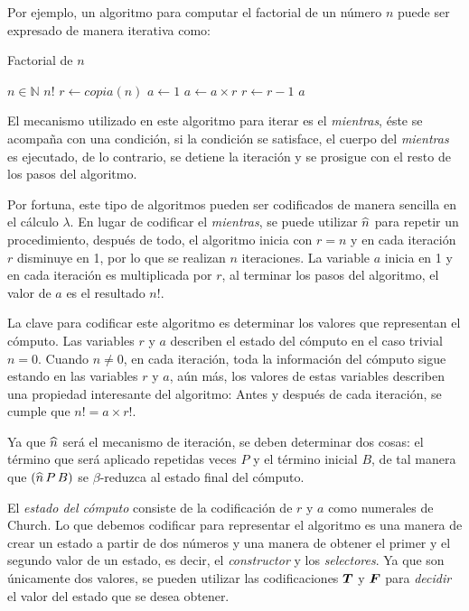 Por ejemplo, un algoritmo para computar el factorial de un número \( n \) puede ser expresado de manera iterativa como:

\begin{algorithm}
  \caption{Factorial de \( n \)}
  \label{alg:factorial}
  \begin{algorithmic}
    \REQUIRE \( n \in \mathbb{N} \)
    \ENSURE \( n! \)
    \STATE \( r \leftarrow copia(n) \)
    \STATE \( a \leftarrow 1 \)
    \STATE \( a \leftarrow a \times r \)
    \STATE \( r \leftarrow r - 1 \)
    \ENDWHILE
    \RETURN \( a \)
  \end{algorithmic}
\end{algorithm}

El mecanismo utilizado en este algoritmo para iterar es el \emph{mientras}, éste se acompaña con una condición, si la condición se satisface, el cuerpo del \emph{mientras} es ejecutado, de lo contrario, se detiene la iteración y se prosigue con el resto de los pasos del algoritmo.

Por fortuna, este tipo de algoritmos pueden ser codificados de manera sencilla en el cálculo \( λ \). En lugar de codificar el \emph{mientras}, se puede utilizar \( \widehat{n} \) para repetir un procedimiento, después de todo, el algoritmo inicia con \( r = n \) y en cada iteración \( r \) disminuye en 1, por lo que se realizan \( n \) iteraciones. La variable \( a \) inicia en 1 y en cada iteración es multiplicada por \( r \), al terminar los pasos del algoritmo, el valor de \( a \) es el resultado \( n! \).

La clave para codificar este algoritmo es determinar los valores que representan el cómputo. Las variables \( r \) y \( a \) describen el estado del cómputo en el caso trivial \( n = 0 \). Cuando \( n \not= 0 \), en cada iteración, toda la información del cómputo sigue estando en las variables \( r \) y \( a \), aún más, los valores de estas variables describen una propiedad interesante del algoritmo: Antes y después de cada iteración, se cumple que \( n! = a \times r! \).

Ya que \( \widehat{n} \) será el mecanismo de iteración, se deben determinar dos cosas: el término que será aplicado repetidas veces \( P \) y el término inicial \( B \), de tal manera que \( (\widehat{n}\, P\, B) \) se \( β \)-reduzca al estado final del cómputo.

El \emph{estado del cómputo} consiste de la codificación de \( r \) y \( a \) como numerales de Church. Lo que debemos codificar para representar el algoritmo es una manera de crear un estado a partir de dos números y una manera de obtener el primer y el segundo valor de un estado, es decir, el \emph{constructor} y los \emph{selectores}. Ya que son únicamente dos valores, se pueden utilizar las codificaciones \( \boldsymbol{T} \) y \( \boldsymbol{F} \) para \emph{decidir} el valor del estado que se desea obtener.

